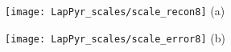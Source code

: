 \documentclass[]{article}
\begin{document}
\centering
\begin{minipage}{0.4\textwidth}
\centering
    \texttt{[image: LapPyr\_scales/scale\_recon8]}
(a)
\end{minipage}
\begin{minipage}{0.4\textwidth}
\centering
      \texttt{[image: LapPyr\_scales/scale\_error8]}
(b)
\end{minipage}
\end{document}
